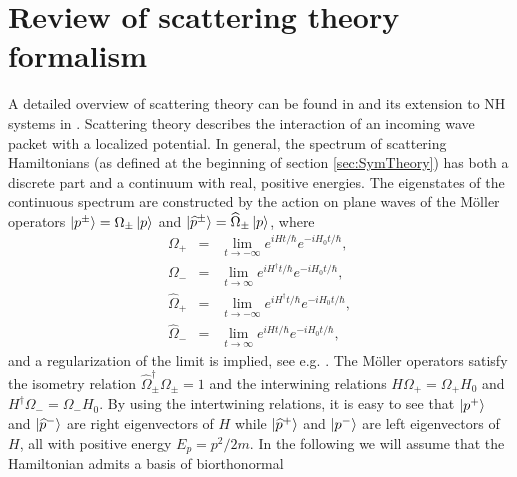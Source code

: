 
\chapter{Review of scattering theory formalism}
\label{Appendix:ScattFormalism}

%
A detailed overview of scattering theory can be found in \cite{Taylor1972} and its extension to NH systems in \cite{Muga2004}. Scattering theory describes the interaction of an incoming wave packet with a localized potential. In general, the spectrum of scattering Hamiltonians (as defined at the beginning of section \ref{sec:SymTheory}) has both a discrete part and a continuum with real, positive energies.
The eigenstates of the continuous spectrum are constructed by the action on plane waves of the M\"oller operators
$\ket{p^\pm}=\Omega_\pm \ket{p}$ and $\ket{\widehat{p}^\pm}=\widehat{\Omega}_\pm \ket{p}$,
where
%
\begin{eqnarray}
    \Omega_+ &=& \lim_{t \to -\infty}e^{i H t / \hbar}e^{-i H_0 t/ \hbar},\nonumber\\
    \Omega_- &=& \lim_{t \to \infty}e^{i H^\dagger t/ \hbar}e^{-i H_0 t/ \hbar},\nonumber\\
    \widehat{\Omega}_+ &=& \lim_{t \to -\infty}e^{i H^\dagger t/ \hbar}e^{-i H_0 t/ \hbar},\nonumber\\
    \widehat{\Omega}_- &=& \lim_{t \to \infty}e^{i H t/ \hbar}e^{-i H_0 t/ \hbar},
\end{eqnarray}
%
and a regularization of the limit is implied, see e.g. \cite{Muga2004}.
The M\"oller operators satisfy the isometry relation $\widehat{\Omega}_{\pm}^\dagger\Omega_{\pm} = 1$ and the interwining relations $H \Omega_+ = \Omega_+ H_0$ and $H^\dagger \Omega_- = \Omega_- H_0$.
By using the intertwining relations, it is easy to see that $\ket{p^+}$ and $\ket{\widehat{p}^-}$ are right eigenvectors of $H$ while $\ket{\widehat{p}^+}$ and $\ket{p^-}$ are left eigenvectors of $H$, all with positive energy $E_p = p^2/2m$. In the following we will assume that the Hamiltonian admits a basis of biorthonormal

